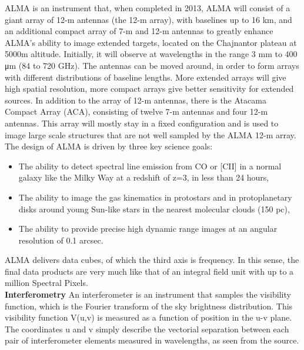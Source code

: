 ALMA is an instrument that, when completed in 2013, ALMA will consist of a giant array of 12-m antennas (the 12-m array), with baselines up to 16 km, and an additional compact array of 7-m and 12-m antennas to greatly enhance ALMA's ability to image extended targets, located on the Chajnantor plateau at 5000m altitude. Initially, it will observe at wavelengths in the range 3 mm to 400 μm (84 to 720 GHz). The antennas can be moved around, in order to form arrays with different distributions of baseline lengths. More extended arrays will give high spatial resolution, more compact arrays give better sensitivity for extended sources. In addition to the array of 12-m antennas, there is the Atacama Compact Array (ACA), consisting of twelve 7-m antennas and four 12-m antennas. This array will mostly stay in a fixed configuration and is used to image large scale structures that are not well sampled by the ALMA 12-m array.\\

The design of ALMA is driven by three key science goals:\\

\begin{itemize}

\item The ability to detect spectral line emission from CO or [CII] in a normal galaxy like the Milky Way at a redshift of z=3, in less than 24 hours,

\item The ability to image the gas kinematics in protostars and in protoplanetary disks around young Sun-like stars in the nearest molecular clouds (150 pc),

\item The ability to provide precise high dynamic range images at an angular resolution of 0.1 arcsec.
\end{itemize}
 
ALMA delivers data cubes, of which the third axis is frequency. In this sense, the final data products are very much like that of an integral field unit with up to a million Spectral Pixels.\\

\textbf{Interferometry}
An interferometer is an instrument that samples the visibility function, which is the Fourier transform of the sky brightness distribution. This visibility function V(u,v) is measured as a function of position in the u-v plane. The coordinates u and v simply describe the vectorial separation between each pair of interferometer elements measured in wavelengths, as seen from the source.\\

